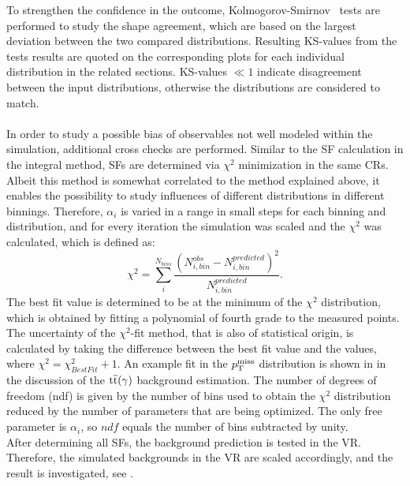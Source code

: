 To strengthen the confidence in the outcome, Kolmogorov-Smirnov~\cite{KS} tests are performed to study the shape agreement, which are based on the largest deviation between the two compared distributions. Resulting KS-values from the tests results are quoted on the corresponding plots for each individual distribution in the related sections. KS-values $\ll1$ indicate disagreement between the input distributions, otherwise the distributions are considered to match.\\\\
In order to study a possible bias of observables not well modeled within the simulation, additional cross checks are performed. Similar to the SF calculation in the integral method, SFs are determined via $\chi^2$ minimization in the same CRs. Albeit this method is somewhat correlated to the method explained above, it enables the possibility to study influences of different distributions in different binnings. Therefore, $\alpha_{i}$ is varied in a range in small steps for each binning and distribution, and for every iteration the simulation was scaled and the $\chi^2$ was calculated, which is defined as:
\begin{equation}
 \chi^2=\sum_i^{N_{bins}} \frac{\left(N_{i,bin}^{obs}-N_{i,bin}^{predicted}\right)^2}{N_{i,bin}^{predicted}}.
\end{equation}
The best fit value is determined to be at the minimum of the $\chi^2$ distribution, which is obtained by fitting a polynomial of fourth grade to the measured points. The uncertainty of the $\chi^2$-fit method, that is also of statistical origin, is calculated by taking the difference between the best fit value and the values, where $\chi^2=\chi^2_{BestFit}+1$. An example fit in the $p_{\mathrm{T}}^\text{miss}$ distribution is shown in  in the discussion of the ${\mathrm{t}\overline{\mathrm{t}}}(\gamma)$ background estimation. The number of degrees of freedom (ndf) is given by the number of bins used to obtain the $\chi^2$ distribution reduced by the number of parameters that are being optimized. The only free parameter is $\alpha_{i}$, so $ndf$ equals the number of bins subtracted by unity.\\
After determining all SFs, the background prediction is tested in the VR. Therefore, the simulated backgrounds in the VR are scaled accordingly, and the result is investigated, see .



